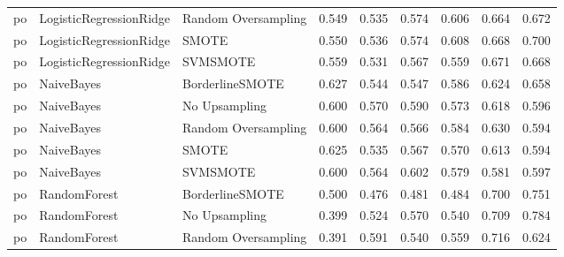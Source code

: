 \begin{tabular}{lllllllll}
      po &      LogisticRegressionRidge & Random Oversampling & 0.549 &                     0.535 &                 0.574 &                  0.606 &                                   0.664 &     0.672 \\
      po &      LogisticRegressionRidge &               SMOTE & 0.550 &                     0.536 &                 0.574 &                  0.608 &                                   0.668 &     0.700 \\
      po &      LogisticRegressionRidge &            SVMSMOTE & 0.559 &                     0.531 &                 0.567 &                  0.559 &                                   0.671 &     0.668 \\
      po &                   NaiveBayes &     BorderlineSMOTE & 0.627 &                     0.544 &                 0.547 &                  0.586 &                                   0.624 &     0.658 \\
      po &                   NaiveBayes &       No Upsampling & 0.600 &                     0.570 &                 0.590 &                  0.573 &                                   0.618 &     0.596 \\
      po &                   NaiveBayes & Random Oversampling & 0.600 &                     0.564 &                 0.566 &                  0.584 &                                   0.630 &     0.594 \\
      po &                   NaiveBayes &               SMOTE & 0.625 &                     0.535 &                 0.567 &                  0.570 &                                   0.613 &     0.594 \\
      po &                   NaiveBayes &            SVMSMOTE & 0.600 &                     0.564 &                 0.602 &                  0.579 &                                   0.581 &     0.597 \\
      po &                 RandomForest &     BorderlineSMOTE & 0.500 &                     0.476 &                 0.481 &                  0.484 &                                   0.700 &     0.751 \\
      po &                 RandomForest &       No Upsampling & 0.399 &                     0.524 &                 0.570 &                  0.540 &                                   0.709 &     0.784 \\
      po &                 RandomForest & Random Oversampling & 0.391 &                     0.591 &                 0.540 &                  0.559 &                                   0.716 &     0.624 \\

\end{tabular}
